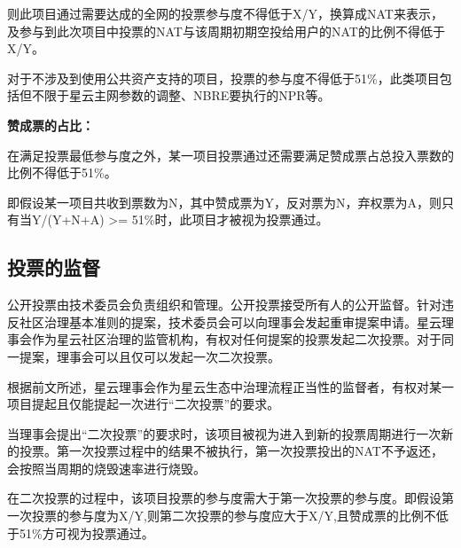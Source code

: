 则此项目通过需要达成的全网的投票参与度不得低于X/Y，换算成NAT来表示，及参与到此次项目中投票的NAT与该周期初期空投给用户的NAT的比例不得低于X/Y。

对于不涉及到使用公共资产支持的项目，投票的参与度不得低于51\%，此类项目包括但不限于星云主网参数的调整、NBRE要执行的NPR等。

\textbf{赞成票的占比：}

在满足投票最低参与度之外，某一项目投票通过还需要满足赞成票占总投入票数的比例不得低于51\%。

即假设某一项目共收到票数为N，其中赞成票为Y，反对票为N，弃权票为A，则只有当Y/(Y+N+A) >= 51\%时，此项目才被视为投票通过。

\subsection{投票的监督}

公开投票由技术委员会负责组织和管理。公开投票接受所有人的公开监督。针对违反社区治理基本准则的提案，技术委员会可以向理事会发起重审提案申请。星云理事会作为星云社区治理的监管机构，有权对任何提案的投票发起二次投票。对于同一提案，理事会可以且仅可以发起一次二次投票。

根据前文所述，星云理事会作为星云生态中治理流程正当性的监督者，有权对某一项目提起且仅能提起一次进行“二次投票”的要求。

当理事会提出“二次投票”的要求时，该项目被视为进入到新的投票周期进行一次新的投票。第一次投票过程中的结果不被执行，第一次投票投出的NAT不予返还，会按照当周期的烧毁速率进行烧毁。

在二次投票的过程中，该项目投票的参与度需大于第一次投票的参与度。即假设第一次投票的参与度为X/Y,则第二次投票的参与度应大于X/Y,且赞成票的比例不低于51\%方可视为投票通过。




